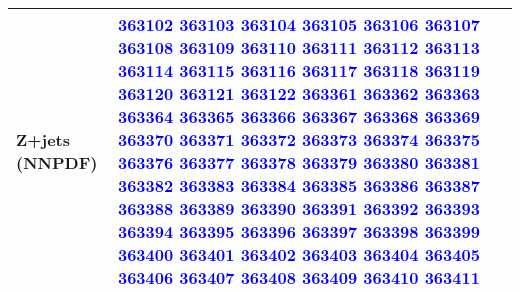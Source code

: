 \documentclass[11pt]{article}
\begin{document}
{\begin{tabular}{|l|p{10cm}|}
			Z+jets (NNPDF) & \textcolor{blue}{363102} \textcolor{blue}{363103} \textcolor{blue}{363104} \textcolor{blue}{363105} \textcolor{blue}{363106} \textcolor{blue}{363107} \textcolor{blue}{363108} \textcolor{blue}{363109} \textcolor{blue}{363110} \textcolor{blue}{363111} \textcolor{blue}{363112} \textcolor{blue}{363113} \textcolor{blue}{363114} \textcolor{blue}{363115} \textcolor{blue}{363116} \textcolor{blue}{363117} \textcolor{blue}{363118} \textcolor{blue}{363119} \textcolor{blue}{363120} \textcolor{blue}{363121} \textcolor{blue}{363122} \textcolor{blue}{363361} \textcolor{blue}{363362} \textcolor{blue}{363363} \textcolor{blue}{363364} \textcolor{blue}{363365} \textcolor{blue}{363366} \textcolor{blue}{363367} \textcolor{blue}{363368} \textcolor{blue}{363369} \textcolor{blue}{363370} \textcolor{blue}{363371} \textcolor{blue}{363372} \textcolor{blue}{363373} \textcolor{blue}{363374} \textcolor{blue}{363375} \textcolor{blue}{363376} \textcolor{blue}{363377} \textcolor{blue}{363378} \textcolor{blue}{363379} \textcolor{blue}{363380} \textcolor{blue}{363381} \textcolor{blue}{363382} \textcolor{blue}{363383} \textcolor{blue}{363384} \textcolor{blue}{363385} \textcolor{blue}{363386} \textcolor{blue}{363387} \textcolor{blue}{363388} \textcolor{blue}{363389} \textcolor{blue}{363390} \textcolor{blue}{363391} \textcolor{blue}{363392} \textcolor{blue}{363393} \textcolor{blue}{363394} \textcolor{blue}{363395} \textcolor{blue}{363396} \textcolor{blue}{363397} \textcolor{blue}{363398} \textcolor{blue}{363399} \textcolor{blue}{363400} \textcolor{blue}{363401} \textcolor{blue}{363402} \textcolor{blue}{363403} \textcolor{blue}{363404} \textcolor{blue}{363405} \textcolor{blue}{363406} \textcolor{blue}{363407} \textcolor{blue}{363408} \textcolor{blue}{363409} \textcolor{blue}{363410} \textcolor{blue}{363411} \\
			\hline

\end{tabular}}
\end{document}
